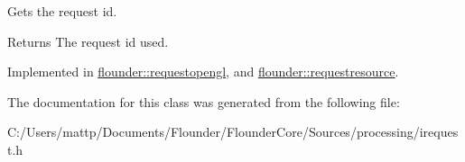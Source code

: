 Gets the request id. 

\begin{DoxyReturn}{Returns}
The request id used. 
\end{DoxyReturn}


Implemented in \hyperlink{classflounder_1_1requestopengl_a897fbd9310873f5a2972764b5d855409}{flounder\+::requestopengl}, and \hyperlink{classflounder_1_1requestresource_a4c46533325ddc35a1b89e4af418ea77e}{flounder\+::requestresource}.



The documentation for this class was generated from the following file\+:\begin{DoxyCompactItemize}
\item 
C\+:/\+Users/mattp/\+Documents/\+Flounder/\+Flounder\+Core/\+Sources/processing/irequest.\+h\end{DoxyCompactItemize}
